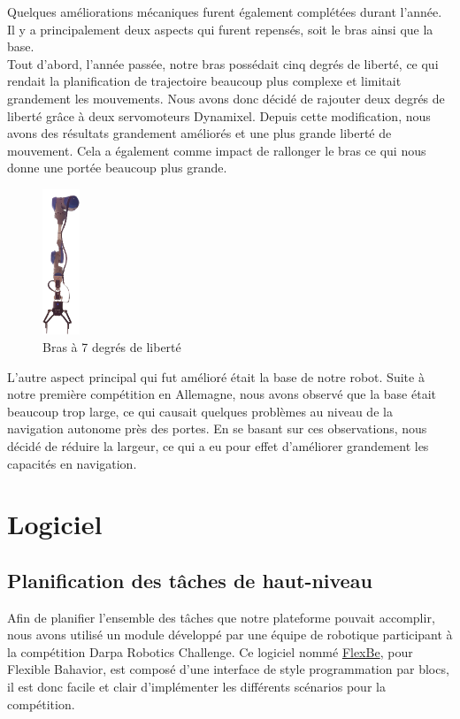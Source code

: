\documentclass[runningheads,a4paper]{llncs}
\begin{document}
Quelques améliorations mécaniques furent également complétées durant l'année. Il y a principalement deux aspects qui furent repensés, soit le bras ainsi que la base.\\

Tout d'abord, l'année passée, notre bras possédait cinq degrés de liberté, ce qui rendait la planification de trajectoire beaucoup plus complexe et limitait grandement les mouvements. Nous avons donc décidé de rajouter deux degrés de liberté grâce à deux servomoteurs Dynamixel. Depuis cette modification, nous avons des résultats grandement améliorés et une plus grande liberté de mouvement. Cela a également comme impact de rallonger le bras ce qui nous donne une portée beaucoup plus grande.\\

\begin{figure}
	\centering
	\includegraphics[width=0.10\textwidth]{images/arm.png}
	\caption{Bras à 7 degrés de liberté}
\end{figure}

L'autre aspect principal qui fut amélioré était la base de notre robot. Suite à notre première compétition en Allemagne, nous avons observé que la base était beaucoup trop large, ce qui causait quelques problèmes au niveau de la navigation autonome près des portes. En se basant sur ces observations, nous décidé de réduire la largeur, ce qui a eu pour effet d'améliorer grandement les capacités en navigation. \\
\newpage
\section{Logiciel}

\subsection{Planification des tâches de haut-niveau}
Afin de planifier l'ensemble des tâches que notre plateforme pouvait accomplir, nous avons utilisé un module développé par une équipe de robotique participant à la compétition Darpa Robotics Challenge. Ce logiciel nommé \href{http://philserver.bplaced.net/fbe/index.php}{FlexBe}\cite{schillinger2016flexbe}, pour Flexible Bahavior, est composé d'une interface de style programmation par blocs, il est donc facile et clair d'implémenter les différents scénarios pour la compétition.\\
\end{document}

